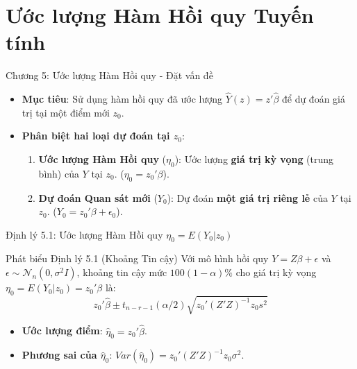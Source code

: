
\section{Ước lượng Hàm Hồi quy Tuyến tính}

\begin{frame}{Chương 5: Ước lượng Hàm Hồi quy - Đặt vấn đề}

    \begin{itemize}
        \item \textbf{Mục tiêu}: Sử dụng hàm hồi quy đã ước lượng $\hat{Y}(z) = z'\hat{\beta}$ để dự đoán giá trị tại một điểm mới $z_0$.
        \item \textbf{Phân biệt hai loại dự đoán tại $z_0$}:
        \begin{enumerate}
            \item \textbf{Ước lượng Hàm Hồi quy} ($\eta_0$): Ước lượng \textbf{giá trị kỳ vọng} (trung bình) của $Y$ tại $z_0$.
            ($\eta_0 = z_0'\beta$).
            \item \textbf{Dự đoán Quan sát mới} ($Y_0$): Dự đoán \textbf{một giá trị riêng lẻ} của $Y$ tại $z_0$.
            ($Y_0 = z_0'\beta + \epsilon_0$).
        \end{enumerate}
    \end{itemize}
\end{frame}

\begin{frame}{Định lý 5.1: Ước lượng Hàm Hồi quy $\eta_0=E(Y_0|z_0)$}

    \begin{block}{Phát biểu Định lý 5.1 (Khoảng Tin cậy)}
        Với mô hình hồi quy $Y=Z\beta+\epsilon$ và $\epsilon \sim \mathcal{N}_n(0,\sigma^2I)$, khoảng tin cậy mức $100(1-\alpha)\%$ cho giá trị kỳ vọng $\eta_0=E(Y_0|z_0)=z_0'\beta$ là:
        \[
            z_0'\hat{\beta} \pm t_{n-r-1}(\alpha/2)\sqrt{z_0'(Z'Z)^{-1}z_0 s^2}
        \]
    \end{block}
    
    \begin{itemize}
        \item \textbf{Ước lượng điểm}: $\hat{\eta}_0 = z_0'\hat{\beta}$.
        \item \textbf{Phương sai của $\hat{\eta}_0$}: $Var(\hat{\eta}_0) = z_0'(Z'Z)^{-1}z_0\sigma^2$.
    \end{itemize}
\end{frame}

